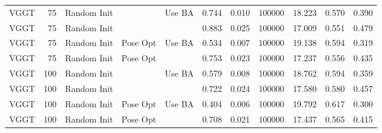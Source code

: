 \begin{table}[H]
\begin{tabular}{lrlllrrrrrr}
VGGT & 75 & Random Init &  & Use BA & 0.744 & 0.010 & 100000 & 18.223 & 0.570 & 0.390 \\
VGGT & 75 & Random Init &  &  & 0.883 & 0.025 & 100000 & 17.009 & 0.551 & 0.479 \\
VGGT & 75 & Random Init & Pose Opt & Use BA & 0.534 & 0.007 & 100000 & 19.138 & 0.594 & 0.319 \\
VGGT & 75 & Random Init & Pose Opt &  & 0.753 & 0.023 & 100000 & 17.237 & 0.556 & 0.435 \\
VGGT & 100 & Random Init &  & Use BA & 0.579 & 0.008 & 100000 & 18.762 & 0.594 & 0.359 \\
VGGT & 100 & Random Init &  &  & 0.722 & 0.024 & 100000 & 17.580 & 0.580 & 0.457 \\
VGGT & 100 & Random Init & Pose Opt & Use BA & 0.404 & 0.006 & 100000 & 19.792 & 0.617 & 0.300 \\
VGGT & 100 & Random Init & Pose Opt &  & 0.708 & 0.021 & 100000 & 17.437 & 0.565 & 0.415 \\
\bottomrule
\end{tabular}
\end{table}